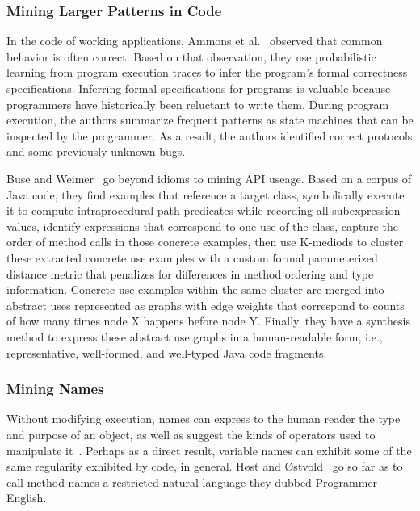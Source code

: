 \subsubsection{Mining Larger Patterns in Code}

In the code of working applications, Ammons et al.~\cite{ammons2002mining} observed that common behavior is often correct. Based on that observation, they use probabilistic learning from program execution traces to infer the program’s formal correctness specifications. Inferring formal specifications for programs is valuable because programmers have historically been reluctant to write them. During program execution, the authors summarize frequent patterns as state machines that can be inspected by the programmer. As a result, the authors identified correct protocols and some previously unknown bugs.

Buse and Weimer~\cite{buse2012synthesizing} go beyond idioms to mining API useage. Based on a corpus of Java code, they find examples that reference a target class, symbolically execute it to compute intraprocedural path predicates while recording all subexpression values, identify expressions that correspond to one use of the class, capture the order of method calls in those concrete examples, then use K-mediods to cluster these extracted concrete use examples with a custom formal parameterized distance metric that penalizes for differences in method ordering and type information. Concrete use examples within the same cluster are merged into abstract uses represented as graphs with edge weights that correspond to counts of how many times node X happens before node Y. Finally, they have a synthesis method to express these abstract use graphs in a human-readable form, i.e., representative, well-formed, and well-typed Java code fragments.

\subsubsection{Mining Names}

Without modifying execution, names can express to the human reader the type and purpose of an object, as well as suggest the kinds of operators used to manipulate it~\cite{jones2008operand}. Perhaps as a direct result, variable names can exhibit some of the same regularity exhibited by code, in general. H{{\o{}}}st and {{\O{}}}stvold~\cite{host2008java} go so far as to call method names a restricted natural language they dubbed Programmer English.

